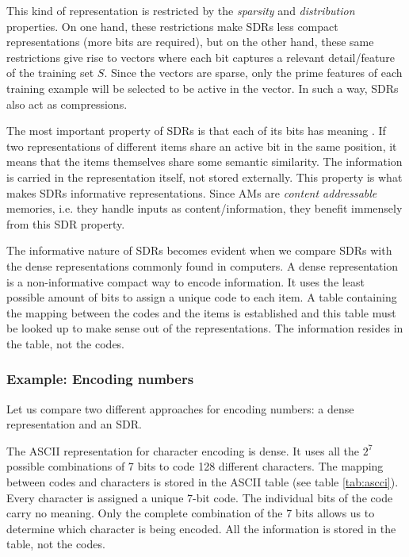 \documentclass[runningheads]{llncs}
\begin{document}
This kind of representation is restricted by the \textit{sparsity} and \textit{distribution} properties. On one hand, these restrictions make SDRs less compact representations (more bits are required), but on the other hand, these same restrictions give rise to vectors where each bit captures a relevant detail/feature of the training set $S$.
Since the vectors are sparse, only the prime features of each training example will be selected to be active in the vector. In such a way, SDRs also act as compressions.

The most important property of SDRs is that each of its bits has meaning \cite{Hawkins-et-al-2016-Book}. If two representations of different items share an active bit in the same position, it means that the items themselves share some semantic similarity. The information is carried in the representation itself, not stored externally. This property is what makes SDRs informative representations.
Since AMs are \textit{content addressable} memories, i.e. they handle inputs as content/information, they benefit immensely from this SDR property.

The informative nature of SDRs becomes evident when we compare SDRs with the dense representations commonly found in computers. A dense representation is a non-informative compact way to encode information. It uses the least possible amount of bits to assign a unique code to each item. A table containing the mapping between the codes and the items is established and this table must be looked up to make sense out of the representations. The information resides in the table, not the codes.

\subsubsection{Example: Encoding numbers}
\label{sec:inputoutput_example}
Let us compare two different approaches for encoding numbers: a dense representation and an SDR.

The ASCII representation for character encoding is dense. It uses all the $2^7$ possible combinations of 7 bits to code 128 different characters. The mapping between codes and characters is stored in the ASCII table (see table \ref{tab:ascci}). Every character is assigned a unique 7-bit code. The individual bits of the code carry no meaning. Only the complete combination of the 7 bits allows us to determine which character is being encoded. All the information is stored in the table, not the codes.
\end{document}
